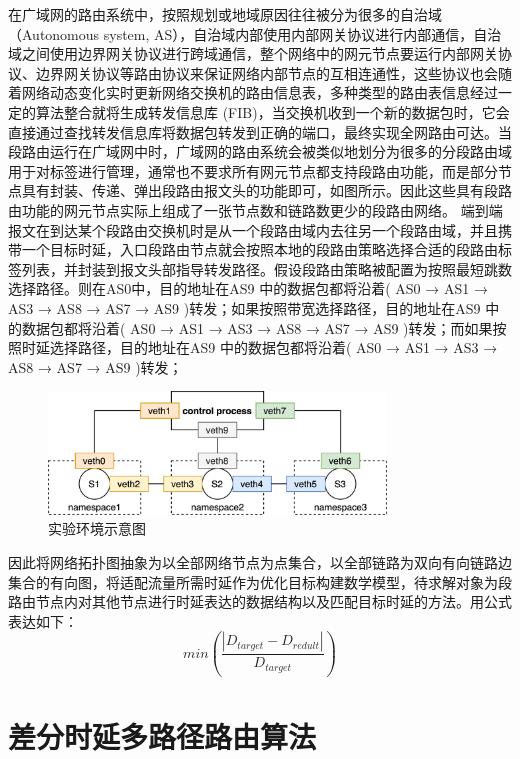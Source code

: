 在广域网的路由系统中，按照规划或地域原因往往被分为很多的自治域（Autonomous system, AS），自治域内部使用内部网关协议进行内部通信，自治域之间使用边界网关协议进行跨域通信，整个网络中的网元节点要运行内部网关协议、边界网关协议等路由协议来保证网络内部节点的互相连通性，这些协议也会随着网络动态变化实时更新网络交换机的路由信息表，多种类型的路由表信息经过一定的算法整合就将生成转发信息库 (FIB)，当交换机收到一个新的数据包时，它会直接通过查找转发信息库将数据包转发到正确的端口，最终实现全网路由可达。当段路由运行在广域网中时，广域网的路由系统会被类似地划分为很多的分段路由域用于对标签进行管理，通常也不要求所有网元节点都支持段路由功能，而是部分节点具有封装、传递、弹出段路由报文头的功能即可，如图所示。因此这些具有段路由功能的网元节点实际上组成了一张节点数和链路数更少的段路由网络。
端到端报文在到达某个段路由交换机时是从一个段路由域内去往另一个段路由域，并且携带一个目标时延，入口段路由节点就会按照本地的段路由策略选择合适的段路由标签列表，并封装到报文头部指导转发路径。假设段路由策略被配置为按照最短跳数选择路径。则在AS0中，目的地址在AS9 中的数据包都将沿着( AS0 → AS1 → AS3 → AS8 → AS7 → AS9 )转发；如果按照带宽选择路径，目的地址在AS9 中的数据包都将沿着( AS0 → AS1 → AS3 → AS8 → AS7 → AS9 )转发；而如果按照时延选择路径，目的地址在AS9 中的数据包都将沿着( AS0 → AS1 → AS3 → AS8 → AS7 → AS9 )转发；

\begin{figure}[htbp]
\setlength{\abovecaptionskip}{15pt plus 3pt minus 2pt}
\centerline{\includegraphics[width=0.8\textwidth]{./figures/ch3-test-env.png}}
\caption{实验环境示意图}
\label{fig-ch3-test-env}
\end{figure}

因此将网络拓扑图抽象为以全部网络节点为点集合，以全部链路为双向有向链路边集合的有向图，将适配流量所需时延作为优化目标构建数学模型，待求解对象为段路由节点内对其他节点进行时延表达的数据结构以及匹配目标时延的方法。用公式表达如下：
$$min(\frac{|D_{target}-D_{redult}|}{D_{target}})$$

\section{差分时延多路径路由算法}

